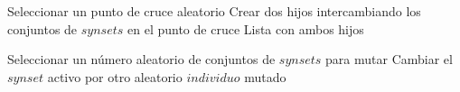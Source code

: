 \documentclass{article}
\begin{document}
\begin{algorithm}
\begin{algorithmic}[1]
			\State Seleccionar un punto de cruce aleatorio
			\State Crear dos hijos intercambiando los conjuntos de $synsets$ en el punto de cruce
			\State \Return Lista con ambos hijos
			\EndFunction
			
			\State Seleccionar un número aleatorio de conjuntos de $synsets$ para mutar
			\State Cambiar el $synset$ activo por otro aleatorio
			\EndFor
			\State \Return $individuo$ mutado
			\EndFunction
			
		\end{algorithmic}
	\end{algorithm}
	
	
	
	
\end{document}
